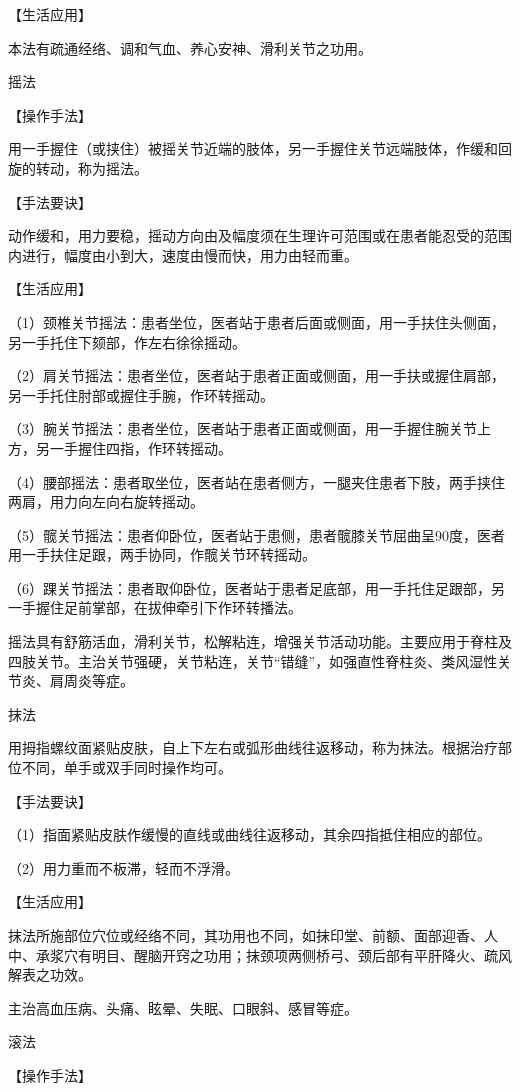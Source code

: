 \documentclass[12pt,UTF8]{ctexbook}
\begin{document}
【生活应用】

本法有疏通经络、调和气血、养心安神、滑利关节之功用。

摇法

【操作手法】

用一手握住（或挟住）被摇关节近端的肢体，另一手握住关节远端肢体，作缓和回旋的转动，称为摇法。

【手法要诀】

动作缓和，用力要稳，摇动方向由及幅度须在生理许可范围或在患者能忍受的范围内进行，幅度由小到大，速度由慢而快，用力由轻而重。

【生活应用】

（1）颈椎关节摇法：患者坐位，医者站于患者后面或侧面，用一手扶住头侧面，另一手托住下颏部，作左右徐徐摇动。

（2）肩关节摇法：患者坐位，医者站于患者正面或侧面，用一手扶或握住肩部，另一手托住肘部或握住手腕，作环转摇动。

（3）腕关节摇法：患者坐位，医者站于患者正面或侧面，用一手握住腕关节上方，另一手握住四指，作环转摇动。

（4）腰部摇法：患者取坐位，医者站在患者侧方，一腿夹住患者下肢，两手挟住两肩，用力向左向右旋转摇动。

（5）髋关节摇法：患者仰卧位，医者站于患侧，患者髋膝关节屈曲呈90度，医者用一手扶住足跟，两手协同，作髋关节环转摇动。

（6）踝关节摇法：患者取仰卧位，医者站于患者足底部，用一手托住足跟部，另一手握住足前掌部，在拔伸牵引下作环转播法。

摇法具有舒筋活血，滑利关节，松解粘连，增强关节活动功能。主要应用于脊柱及四肢关节。主治关节强硬，关节粘连，关节“错缝”，如强直性脊柱炎、类风湿性关节炎、肩周炎等症。

抹法

用拇指螺纹面紧贴皮肤，自上下左右或弧形曲线往返移动，称为抹法。根据治疗部位不同，单手或双手同时操作均可。

【手法要诀】

（1）指面紧贴皮肤作缓慢的直线或曲线往返移动，其余四指抵住相应的部位。

（2）用力重而不板滞，轻而不浮滑。

【生活应用】

抹法所施部位穴位或经络不同，其功用也不同，如抹印堂、前额、面部迎香、人中、承浆穴有明目、醒脑开窍之功用；抹颈项两侧桥弓、颈后部有平肝降火、疏风解表之功效。

主治高血压病、头痛、眩晕、失眠、口眼斜、感冒等症。

滚法

【操作手法】
\end{document}
